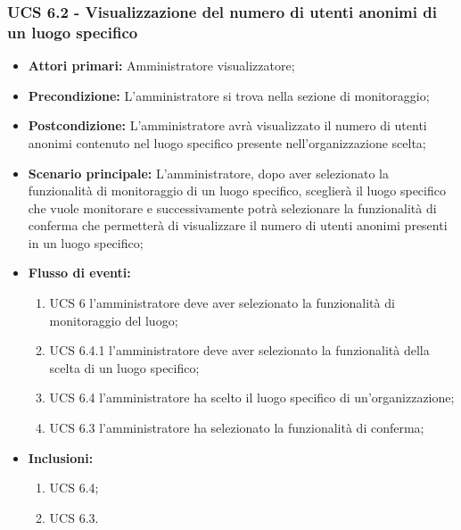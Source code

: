 \subsubsection{UCS 6.2 - Visualizzazione del numero di utenti anonimi di un luogo specifico}%
\begin{itemize}
	\item \textbf{Attori primari:} Amministratore visualizzatore;
	\item \textbf{Precondizione:} L'amministratore si trova nella sezione di monitoraggio;
	\item \textbf{Postcondizione:} L'amministratore avrà visualizzato il numero di utenti anonimi contenuto nel luogo specifico presente nell'organizzazione scelta;
	\item \textbf{Scenario principale:}  L'amministratore, dopo aver selezionato la funzionalità di monitoraggio di un luogo specifico, sceglierà il luogo specifico che vuole monitorare e successivamente potrà selezionare la funzionalità di conferma che permetterà di visualizzare il numero di utenti anonimi presenti in un luogo specifico;
	\item \textbf{Flusso di eventi:} 
	\begin{enumerate}
		\item UCS 6 l'amministratore deve aver selezionato la funzionalità di monitoraggio del luogo;
		\item UCS 6.4.1 l'amministratore deve aver selezionato la funzionalità della scelta di un luogo specifico;
		\item UCS 6.4 l'amministratore ha scelto il luogo specifico di un'organizzazione;
		\item UCS 6.3 l'amministratore ha selezionato la funzionalità di conferma;
	\end{enumerate}
	\item \textbf{Inclusioni:}
	\begin{enumerate}
		\item UCS 6.4;
		\item UCS 6.3.
	\end{enumerate}
\end{itemize}

